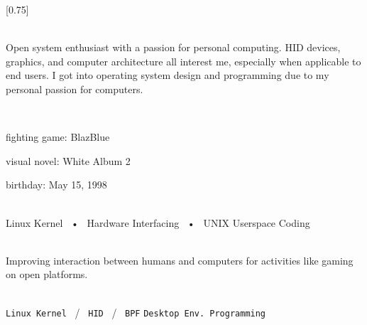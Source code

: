 \documentclass[lighthipster]{simplehipstercv}
\begin{document}
\setlength{\columnsep}{1.5cm}
[0.75]
\begin{paracol}{2}

\paracolbackgroundoptions



\footnotesize
{\setasidefontcolour
\flushright
\begin{center}
\end{center}

\\[0.5em]

{\footnotesize
Open system enthusiast with a passion for personal computing.
HID devices, graphics, and computer architecture all interest me,
especially when applicable to end users. I got into operating system
design and programming due to my personal passion for computers.
}
\bigskip

 \\[0.5em]




fighting game: BlazBlue

visual novel: White Album 2

birthday: May 15, 1998

\bigskip

 \\[0.5em]

Linux Kernel ~•~ Hardware Interfacing ~•~ UNIX Userspace Coding

\bigskip



\bigskip

\\[0.5em]

Improving interaction between humans and computers for activities like gaming on open platforms.
\bigskip

\\[0.5em]

\texttt{Linux Kernel} ~/~ \texttt{HID} ~/~ \texttt{BPF}
\texttt{Desktop Env. Programming}

}
\end{paracol}
\end{document}
